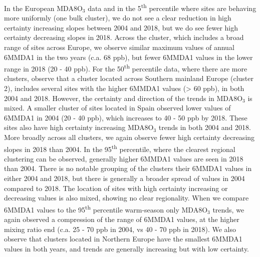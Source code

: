 \documentclass[journal abbreviation, manuscript]{copernicus}
\begin{document}
In the European MDA8O$_3$ data and in the 5\textsuperscript{th} percentile where sites are behaving more uniformly (one bulk cluster), we do not see a clear reduction in high certainty increasing slopes between 2004 and 2018, but we do see fewer high certainty decreasing slopes in 2018. Across the cluster, which includes a broad range of sites across Europe, we observe similar maximum values of annual 6MMDA1 in the two years (c.a. 68 ppb), but fewer 6MMDA1 values in the lower range in 2018 (20 - 40 ppb). For the 50\textsuperscript{th} percentile data, where there are more clusters, observe that a cluster located across Southern mainland Europe (cluster 2), includes several sites with the higher 6MMDA1 values (> 60 ppb), in both 2004 and 2018. However, the certainty and direction of the trends in MDA8O$_3$ is mixed. A smaller cluster of sites located in Spain observed lower values of 6MMDA1 in 2004 (20 - 40 ppb), which increases to 40 - 50 ppb by 2018. These sites also have high certainty increasing MDA8O$_3$ trends in both 2004 and 2018. More broadly across all clusters, we again observe fewer high certainty decreasing slopes in 2018 than 2004. In the 95\textsuperscript{th} percentile, where the clearest regional clustering can be observed, generally higher 6MMDA1 values are seen in 2018 than 2004. There is no notable grouping of the clusters their 6MMDA1 values in either 2004 and 2018, but there is generally a broader spread of values in 2004 compared to 2018. The location of sites with high certainty increasing or decreasing values is also mixed, showing no clear regionality. When we compare 6MMDA1 values to the 95\textsuperscript{th} percentile warm-season only MDA8O$_3$ trends, we again observed a compression of the range of 6MMDA1 values, at the higher mixing ratio end (c.a. 25 - 70 ppb in 2004, vs 40 - 70 ppb in 2018). We also observe that clusters located in Northern Europe have the smallest 6MMDA1 values in both years, and trends are generally increasing but with low certainty.
\end{document}
